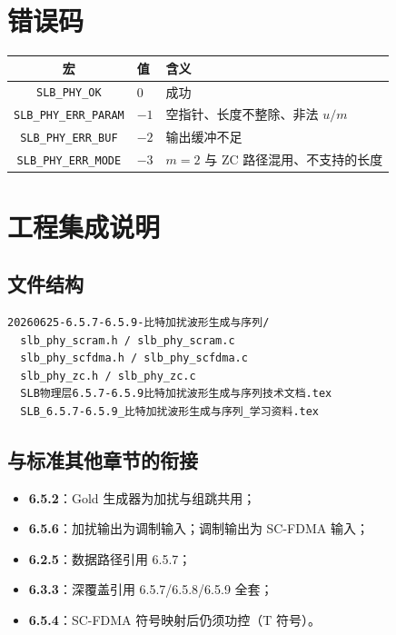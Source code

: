 \documentclass[11pt,a4paper]{ctexart}
\begin{document}
\section{错误码}

\begin{table}[h]
\centering
\begin{tabular}{cll}
\toprule
\textbf{宏} & \textbf{值} & \textbf{含义} \\
\midrule
\texttt{SLB\_PHY\_OK} & 0 & 成功 \\
\texttt{SLB\_PHY\_ERR\_PARAM} & $-1$ & 空指针、长度不整除、非法 $u/m$ \\
\texttt{SLB\_PHY\_ERR\_BUF} & $-2$ & 输出缓冲不足 \\
\texttt{SLB\_PHY\_ERR\_MODE} & $-3$ & $m=2$ 与 ZC 路径混用、不支持的长度 \\
\bottomrule
\end{tabular}
\end{table}

\section{工程集成说明}

\subsection{文件结构}

\begin{lstlisting}
20260625-6.5.7-6.5.9-比特加扰波形生成与序列/
  slb_phy_scram.h / slb_phy_scram.c
  slb_phy_scfdma.h / slb_phy_scfdma.c
  slb_phy_zc.h / slb_phy_zc.c
  SLB物理层6.5.7-6.5.9比特加扰波形生成与序列技术文档.tex
  SLB_6.5.7-6.5.9_比特加扰波形生成与序列_学习资料.tex
\end{lstlisting}

\subsection{与标准其他章节的衔接}

\begin{itemize}[nosep]
  \item \textbf{6.5.2}：Gold 生成器为加扰与组跳共用；
  \item \textbf{6.5.6}：加扰输出为调制输入；调制输出为 SC-FDMA 输入；
  \item \textbf{6.2.5}：数据路径引用 6.5.7；
  \item \textbf{6.3.3}：深覆盖引用 6.5.7/6.5.8/6.5.9 全套；
  \item \textbf{6.5.4}：SC-FDMA 符号映射后仍须功控（T 符号）。
\end{itemize}
\end{document}
